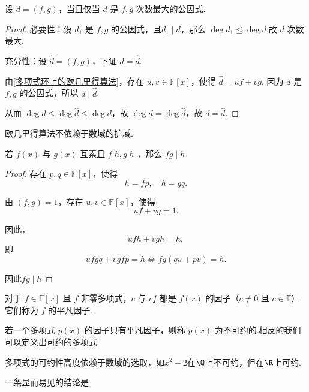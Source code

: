 \begin{corollary}
	设 \( d = (f, g) \)，当且仅当 \( d \) 是 \( f, g \) 次数最大的公因式.
\end{corollary}
\begin{proof}
	必要性：设 \( d_1 \) 是 \( f, g \) 的公因式，且\( d_1 \mid d \)，那么 \( \deg d_1 \leqslant \deg d \).故 \( d \) 次数最大.
	
	充分性：设 \( \hat{d} = (f, g) \)，下证 \( d = \hat{d} \).
	
	由\ref{多项式环上的欧几里得算法}，存在 \( u, v \in \mathbb{F}[x] \)，使得 \( \hat{d} = uf + vg \).
	因为 \( d \) 是 \( f, g \) 的公因式，所以 \( d \mid \hat{d} \).
	
	从而 \( \deg d \leqslant \deg \hat{d} \leqslant \deg d \)，故 \( \deg d = \deg \hat{d} \)，故 \( d = \hat{d} \).
	
\end{proof}

欧几里得算法不依赖于数域的扩域.
\begin{corollary}
若 $f(x)$ 与 $g(x)$ 互素且 $f|h, g| h$ ，那么 $f g \mid h$
\end{corollary}
\begin{proof}

存在 \( p, q \in \mathbb{F}[x] \)，使得
\[ h = fp, \quad h = gq. \]

由 \( (f, g) = 1 \)，存在 \( u, v \in \mathbb{F}[x] \)，使得
\[ uf + vg = 1. \]

因此，
\[ ufh + vgh = h, \]
即
\[ ufgq + vgfp = h \Leftrightarrow fg(qu + pv) = h. \]

因此$f g \mid h$

\end{proof}

\begin{definition}
	对于 \( f \in \mathbb{F}[x] \) 且 \( f \) 非零多项式，\( c \) 与 \( cf \) 都是 \( f(x) \) 的因子（\( c \neq 0 \) 且 \( c \in \mathbb{F} \)）.它们称为 \( f \) 的平凡因子.
	
	若一个多项式 \( p(x) \) 的因子只有平凡因子，则称 \( p(x) \) 为不可约的.相反的我们可以定义出可约的多项式
\end{definition}
多项式的可约性高度依赖于数域的选取，如$x^2-2$在$\Q$上不可约，但在$\R$上可约.

一条显而易见的结论是

